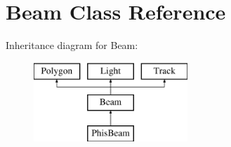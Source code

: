 \hypertarget{class_beam}{}\section{Beam Class Reference}
\label{class_beam}
Inheritance diagram for Beam\+:\begin{figure}[H]
\begin{center}
\leavevmode
\includegraphics[height=3.000000cm]{class_beam}
\end{center}
\end{figure}
